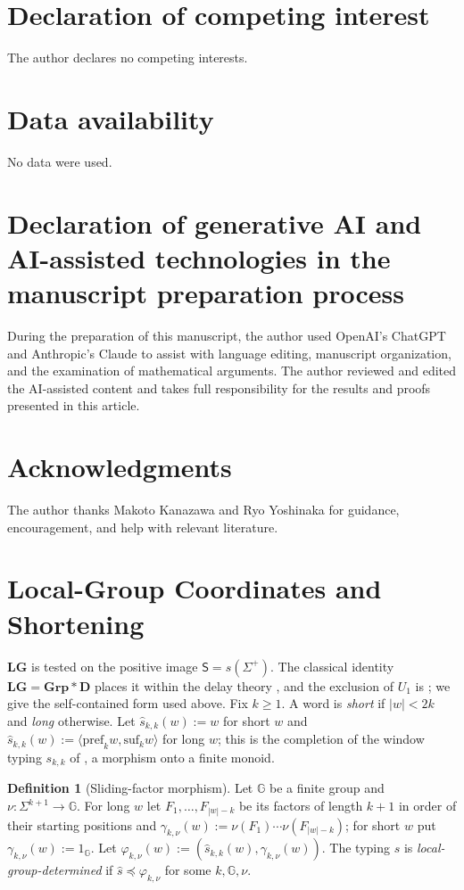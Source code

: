 \documentclass[11pt]{article}
\numberwithin{equation}{section}
\theoremstyle{plain}
\theoremstyle{definition}
\newtheorem{definition}[theorem]{Definition}
\theoremstyle{remark}
\theoremstyle{plain}
\newcommand{\LG}{\mathbf{LG}}
\begin{document}
\section*{Declaration of competing interest}
The author declares no competing interests.

\section*{Data availability}
No data were used.

\section*{Declaration of generative AI and AI-assisted technologies in the manuscript preparation process}
During the preparation of this manuscript, the author used OpenAI's ChatGPT
and Anthropic's Claude to assist with language editing, manuscript
organization, and the examination of mathematical arguments.  The author
reviewed and edited the AI-assisted content and takes full responsibility for
the results and proofs presented in this article.

\section*{Acknowledgments}
The author thanks Makoto Kanazawa and Ryo Yoshinaka for guidance,
encouragement, and help with relevant literature.

\appendix

\section{Local-Group Coordinates and Shortening}
\label{app:lg}

$\LG$ is tested on the positive image $\mathsf S=s(\Sigma^+)$.  The classical
identity $\LG=\mathbf{Grp}*\mathbf D$ places it within the delay theory
\cite{Straubing1985,Tilson1987}, and the exclusion of $U_1$ is
\cite[Proposition~2.3]{AlmeidaEtAl2009}; we give the self-contained form used
above.  Fix $k\ge1$.  A word is \emph{short} if $|w|<2k$ and \emph{long}
otherwise.  Let $\widehat s_{k,k}(w):=w$ for short $w$ and
$\widehat s_{k,k}(w):=\langle\mathrm{pref}_k w,\mathrm{suf}_k w\rangle$ for long $w$;
this is the completion of the window typing $s_{k,k}$ of
\cite[Proposition~3.3]{kuriyamaCFG}, a morphism onto a finite monoid.

\begin{definition}[Sliding-factor morphism]
\label{def:sliding}
Let $\mathbb G$ be a finite group and $\nu:\Sigma^{k+1}\to\mathbb G$.  For long $w$ let
$F_1,\ldots,F_{|w|-k}$ be its factors of length $k+1$ in order of their starting
positions and $\gamma_{k,\nu}(w):=\nu(F_1)\cdots\nu(F_{|w|-k})$; for short $w$
put $\gamma_{k,\nu}(w):=1_{\mathbb G}$.  Let
$\varphi_{k,\nu}(w):=(\widehat s_{k,k}(w),\gamma_{k,\nu}(w))$.  The typing $s$ is
\emph{local-group-determined} if $\widehat s\preceq\varphi_{k,\nu}$ for some
$k,\mathbb G,\nu$.
\end{definition}
\end{document}
